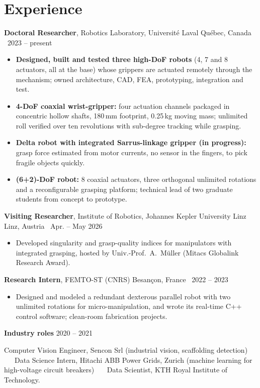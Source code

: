 \documentclass[10pt,letterpaper]{article}
\newcommand{\role}[4]{\textbf{#1}, #2 \hfill {\color{muted}#3 \textbar\ #4}\par}
\begin{document}
\section{Experience}
\role{Doctoral Researcher}{Robotics Laboratory, Universit\'e Laval}{Qu\'ebec, Canada}{2023 -- present}
\begin{itemize}
\item \textbf{Designed, built and tested three high-DoF robots} (4, 7 and 8 actuators, all at the base) whose grippers are
actuated remotely through the mechanism; owned architecture, CAD, FEA, prototyping, integration and test.
\item \textbf{4-DoF coaxial wrist-gripper:} four actuation channels packaged in concentric hollow shafts, 180\,mm
footprint, 0.25\,kg moving mass; unlimited roll verified over ten revolutions with sub-degree tracking while grasping.
\item \textbf{Delta robot with integrated Sarrus-linkage gripper (in progress):} grasp force estimated from motor currents,
no sensor in the fingers, to pick fragile objects quickly.
\item \textbf{(6+2)-DoF robot:} 8 coaxial actuators, three orthogonal unlimited rotations and a reconfigurable grasping
platform; technical lead of two graduate students from concept to prototype.
\end{itemize}

\vspace{3pt}
\role{Visiting Researcher}{Institute of Robotics, Johannes Kepler University Linz}{Linz, Austria}{Apr. -- May 2026}
\begin{itemize}
\item Developed singularity and grasp-quality indices for manipulators with integrated grasping, hosted by Univ.-Prof.~A.~M\"uller (Mitacs Globalink Research Award).
\end{itemize}

\vspace{3pt}
\role{Research Intern}{FEMTO-ST (CNRS)}{Besan\c{c}on, France}{2022 -- 2023}
\begin{itemize}
\item Designed and modeled a redundant dexterous parallel robot with two unlimited rotations for micro-manipulation, and wrote its real-time C++ control software; clean-room fabrication projects.
\end{itemize}

\vspace{3pt}
\textbf{Industry roles} \hfill {\color{muted}2020 -- 2021}\par
{\small Computer Vision Engineer, Sencon Srl (industrial vision, scaffolding detection) \ \textbullet\ \ Data Science
Intern, Hitachi ABB Power Grids, Zurich (machine learning for high-voltage circuit breakers) \ \textbullet\ \ Data
Scientist, KTH Royal Institute of Technology.}
\end{document}
